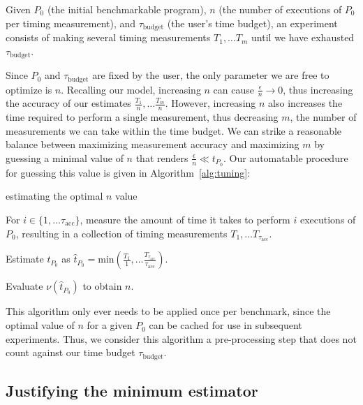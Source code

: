 \documentclass[conference]{IEEEtran}
\begin{document}
Given $P_0$ (the initial benchmarkable program), $n$ (the number of executions of $P_0$ per
timing measurement), and $\tau_{\textrm{budget}}$ (the user's time budget), an experiment
consists of making several timing measurements $T_1, \dots T_m$ until we have exhausted
$\tau_{\textrm{budget}}$.

Since $P_0$ and $\tau_{\textrm{budget}}$ are fixed by the user, the only parameter we are
free to optimize is $n$. Recalling our model, increasing $n$ can cause $\frac{\epsilon}{n}
\to 0$, thus increasing the accuracy of our estimates $\frac{T_1}{n}, \dots \frac{T_m}{n}$.
However, increasing $n$ also increases the time required to perform a single measurement,
thus decreasing $m$, the number of measurements we can take within the time budget. We can
strike a reasonable balance between maximizing measurement accuracy and maximizing $m$ by
guessing a minimal value of $n$ that renders $\frac{\epsilon}{n} \ll t_{P_0}$. Our
automatable procedure for guessing this value is given in Algorithm~\ref{alg:tuning}:

\newpage %

\begin{algorithm}
    \caption{estimating the optimal $n$ value}
    \label{alg:tuning}
    For $i \in \{1, \dots \tau_{\textrm{acc}}\}$, measure the amount of time it takes
    to perform $i$ executions of $P_0$, resulting in a collection of timing measurements
    $T_1, \dots T_{\tau_{\textrm{acc}}}$.

    Estimate $t_{P_0}$ as $\hat{t}_{P_0} = \textrm{min}(\frac{T_1}{1}, \dots \frac{T_{\tau_{\textrm{acc}}}}{\tau_{\textrm{acc}}})$.

    Evaluate $\nu(\hat{t}_{P_0})$ to obtain $n$.
\end{algorithm}

This algorithm only ever needs to be applied once per benchmark, since the optimal value of
$n$ for a given $P_0$ can be cached for use in subsequent experiments. Thus, we consider
this algorithm a pre-processing step that does not count against our time budget
$\tau_{\textrm{budget}}$.

\label{sec:minimum}
\subsection{Justifying the minimum estimator}
\end{document}
